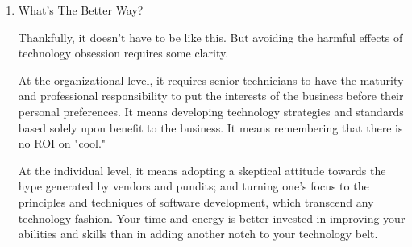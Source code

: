 \documentclass{article}
\begin{document}
\begin{enumerate}
\item What's The Better Way?
\label{sec:orgheadline420}

Thankfully, it doesn't have to be like this. But avoiding the harmful
effects of technology obsession requires some clarity.

At the organizational level, it requires senior technicians to have the
maturity and professional responsibility to put the interests of the
business before their personal preferences. It means developing
technology strategies and standards based solely upon benefit to the
business. It means remembering that there is no ROI on "cool."

At the individual level, it means adopting a skeptical attitude towards
the hype generated by vendors and pundits; and turning one's focus to
the principles and techniques of software development, which transcend
any technology fashion. Your time and energy is better invested in
improving your abilities and skills than in adding another notch to your
technology belt.
\end{enumerate}
\end{document}
